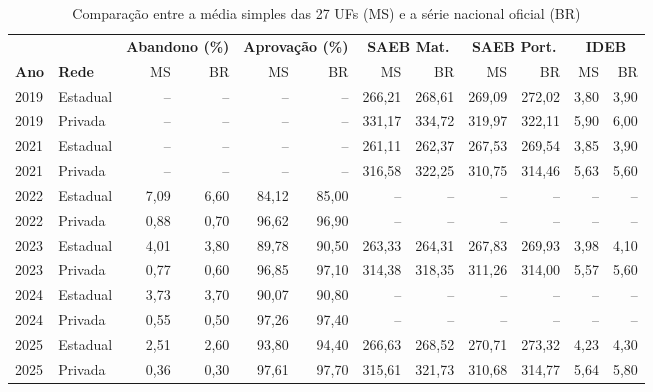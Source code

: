 \begin{apendicesenv}
    \begin{table}[!htb]
        \centering
        \caption{Comparação entre a média simples das 27 UFs (MS) e a série nacional oficial (BR)}
        \label{tab_media_vs_nacional}
        \footnotesize
        \setlength{\tabcolsep}{3.5pt}
        \begin{tabular}{llrrrrrrrrrr}
            \toprule
            & & \multicolumn{2}{c}{\textbf{Abandono (\%)}} & \multicolumn{2}{c}{\textbf{Aprovação (\%)}} & \multicolumn{2}{c}{\textbf{SAEB Mat.}} & \multicolumn{2}{c}{\textbf{SAEB Port.}} & \multicolumn{2}{c}{\textbf{IDEB}} \\
            \cmidrule(lr){3-4} \cmidrule(lr){5-6} \cmidrule(lr){7-8} \cmidrule(lr){9-10} \cmidrule(lr){11-12}
            \textbf{Ano} & \textbf{Rede} & MS & BR & MS & BR & MS & BR & MS & BR & MS & BR \\
            \midrule
            2019 & Estadual & -- & -- & -- & -- & 266,21 & 268,61 & 269,09 & 272,02 & 3,80 & 3,90 \\
            2019 & Privada  & -- & -- & -- & -- & 331,17 & 334,72 & 319,97 & 322,11 & 5,90 & 6,00 \\
            2021 & Estadual & -- & -- & -- & -- & 261,11 & 262,37 & 267,53 & 269,54 & 3,85 & 3,90 \\
            2021 & Privada  & -- & -- & -- & -- & 316,58 & 322,25 & 310,75 & 314,46 & 5,63 & 5,60 \\
            2022 & Estadual & 7,09 & 6,60 & 84,12 & 85,00 & -- & -- & -- & -- & -- & -- \\
            2022 & Privada  & 0,88 & 0,70 & 96,62 & 96,90 & -- & -- & -- & -- & -- & -- \\
            2023 & Estadual & 4,01 & 3,80 & 89,78 & 90,50 & 263,33 & 264,31 & 267,83 & 269,93 & 3,98 & 4,10 \\
            2023 & Privada  & 0,77 & 0,60 & 96,85 & 97,10 & 314,38 & 318,35 & 311,26 & 314,00 & 5,57 & 5,60 \\
            2024 & Estadual & 3,73 & 3,70 & 90,07 & 90,80 & -- & -- & -- & -- & -- & -- \\
            2024 & Privada  & 0,55 & 0,50 & 97,26 & 97,40 & -- & -- & -- & -- & -- & -- \\
            2025 & Estadual & 2,51 & 2,60 & 93,80 & 94,40 & 266,63 & 268,52 & 270,71 & 273,32 & 4,23 & 4,30 \\
            2025 & Privada  & 0,36 & 0,30 & 97,61 & 97,70 & 315,61 & 321,73 & 310,68 & 314,77 & 5,64 & 5,80 \\
            \bottomrule
        \end{tabular}
    \end{table}


\end{apendicesenv}
